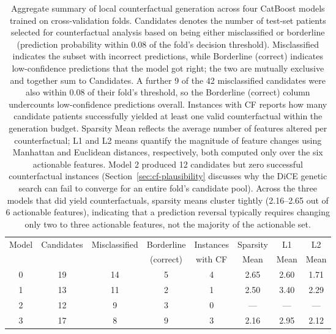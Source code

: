 \documentclass[pdflatex,sn-mathphys-num]{sn-jnl}%
\theoremstyle{thmstyleone}%
\theoremstyle{thmstyletwo}%
\theoremstyle{thmstylethree}%
\begin{document}
\begin{appendices}
\begin{table}[tbp]
    \footnotesize
    \centering
    \begin{tabular}{cccccccc}
        \toprule
        Model & Candidates & Misclassified & Borderline & Instances  & Sparsity & L1 & L2 \\
         &  &  & (correct) & with CF & Mean & Mean & Mean  \\
        \midrule
        0 & 19 & 14 & 5 & 4 & 2.65 & 2.60 & 1.71 \\
        1 & 13 & 11 & 2 & 1 & 2.50 & 3.40 & 2.29 \\
        2 & 12 & 9 & 3 & 0 &---&---&---\\
        3 & 17 & 8 & 9 & 3 & 2.16 & 2.95 & 2.12 \\
        \bottomrule
    \end{tabular}
    \caption{Aggregate summary of local counterfactual generation across four CatBoost models trained on cross-validation folds. Candidates denotes the number of test-set patients selected for counterfactual analysis based on being either misclassified or borderline (prediction probability within 0.08 of the fold's decision threshold). Misclassified indicates the subset with incorrect predictions, while Borderline (correct) indicates low-confidence predictions that the model got right; the two are mutually exclusive and together sum to Candidates. A further 9 of the 42 misclassified candidates were also within 0.08 of their fold's threshold, so the Borderline (correct) column undercounts low-confidence predictions overall. Instances with CF reports how many candidate patients successfully yielded at least one valid counterfactual within the generation budget. Sparsity Mean reflects the average number of features altered per counterfactual; L1 and L2 means quantify the magnitude of feature changes using Manhattan and Euclidean distances, respectively, both computed only over the six actionable features. Model 2 produced 12 candidates but zero successful counterfactual instances (Section~\ref{sec:cf-plausibility} discusses why the DiCE genetic search can fail to converge for an entire fold's candidate pool). Across the three models that did yield counterfactuals, sparsity means cluster tightly (2.16--2.65 out of 6 actionable features), indicating that a prediction reversal typically requires changing only two to three actionable features, not the majority of the actionable set.
    }
    \label{tab:localcf-model-level}
\end{table}


\end{appendices}
\end{document}
